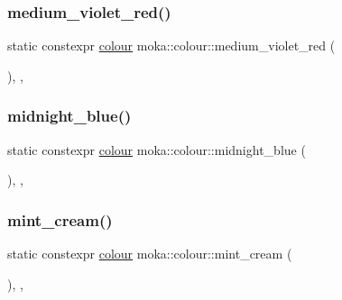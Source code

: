 \mbox{\label{classmoka_1_1colour_a65612bcc537f83b7973fd7639d26a22a}} 
\subsubsection{\texorpdfstring{medium\_violet\_red()}{medium\_violet\_red()}}
{\footnotesize\ttfamily static constexpr \mbox{\hyperlink{classmoka_1_1colour}{colour}} moka\+::colour\+::medium\+\_\+violet\+\_\+red (\begin{DoxyParamCaption}{ }\end{DoxyParamCaption})\hspace{0.3cm}{\ttfamily [inline]}, {\ttfamily [static]}, {\ttfamily [noexcept]}}

\mbox{\label{classmoka_1_1colour_a3bfea780e8f0f1d4c79716c1890362d6}} 
\subsubsection{\texorpdfstring{midnight\_blue()}{midnight\_blue()}}
{\footnotesize\ttfamily static constexpr \mbox{\hyperlink{classmoka_1_1colour}{colour}} moka\+::colour\+::midnight\+\_\+blue (\begin{DoxyParamCaption}{ }\end{DoxyParamCaption})\hspace{0.3cm}{\ttfamily [inline]}, {\ttfamily [static]}, {\ttfamily [noexcept]}}

\mbox{\label{classmoka_1_1colour_a146279b6490d141db7643651fe501693}} 
\subsubsection{\texorpdfstring{mint\_cream()}{mint\_cream()}}
{\footnotesize\ttfamily static constexpr \mbox{\hyperlink{classmoka_1_1colour}{colour}} moka\+::colour\+::mint\+\_\+cream (\begin{DoxyParamCaption}{ }\end{DoxyParamCaption})\hspace{0.3cm}{\ttfamily [inline]}, {\ttfamily [static]}, {\ttfamily [noexcept]}}

